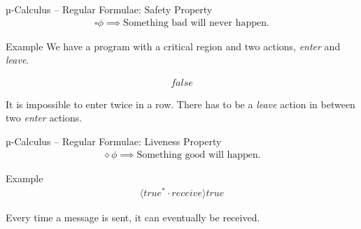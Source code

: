 \documentclass[aspectratio=1610]{beamer}
\begin{document}
  \begin{frame}{µ-Calculus – Regular Formulae: Safety Property}
    \begin{align*}
      \square\phi \implies \text{Something bad will never happen.}
    \end{align*}

    \begin{exampleblock}{Example}
      We have a program with a critical region and two actions, \textit{enter} and \textit{leave}.

      \begin{align*}
        [true^*\cdot enter \cdot \overline{leave}^* \cdot enter]false
      \end{align*}

      It is impossible to enter twice in a row. There has to be a \textit{leave} action in between two \textit{enter} actions.
    \end{exampleblock}
  \end{frame}

  \begin{frame}{µ-Calculus – Regular Formulae: Liveness Property}
    \begin{align*}
      \diamond\phi \implies \text{Something good will happen.}
    \end{align*}

    \begin{exampleblock}{Example}
      \begin{align*}
        [true^*\cdot send]\langle true^* \cdot receive \rangle true
      \end{align*}

      Every time a message is sent, it can eventually be received.
    \end{exampleblock}
  \end{frame}
\end{document}
